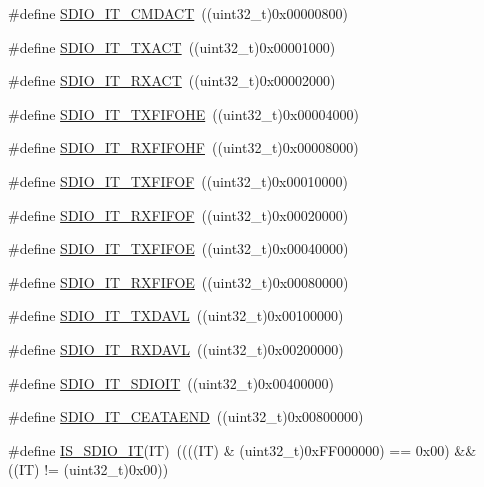 \begin{DoxyCompactItemize}
\item 
\#define \hyperlink{group___s_d_i_o___interrupt__sources_gae73ae9bc72eaeedc2a37221697bc33e2}{S\+D\+I\+O\+\_\+\+I\+T\+\_\+\+C\+M\+D\+A\+CT}~((uint32\+\_\+t)0x00000800)
\item 
\#define \hyperlink{group___s_d_i_o___interrupt__sources_ga811e683588ab887abb0101defafdb51e}{S\+D\+I\+O\+\_\+\+I\+T\+\_\+\+T\+X\+A\+CT}~((uint32\+\_\+t)0x00001000)
\item 
\#define \hyperlink{group___s_d_i_o___interrupt__sources_ga1d9a59a2415b57bdf9827423cb6ce3a0}{S\+D\+I\+O\+\_\+\+I\+T\+\_\+\+R\+X\+A\+CT}~((uint32\+\_\+t)0x00002000)
\item 
\#define \hyperlink{group___s_d_i_o___interrupt__sources_gaf538ae7dd73d55e76069e8710858038a}{S\+D\+I\+O\+\_\+\+I\+T\+\_\+\+T\+X\+F\+I\+F\+O\+HE}~((uint32\+\_\+t)0x00004000)
\item 
\#define \hyperlink{group___s_d_i_o___interrupt__sources_gadcbc1a0de8b9df83b5c6c839b4739c87}{S\+D\+I\+O\+\_\+\+I\+T\+\_\+\+R\+X\+F\+I\+F\+O\+HF}~((uint32\+\_\+t)0x00008000)
\item 
\#define \hyperlink{group___s_d_i_o___interrupt__sources_ga3ec471bd9233561d6e929ebac6362b75}{S\+D\+I\+O\+\_\+\+I\+T\+\_\+\+T\+X\+F\+I\+F\+OF}~((uint32\+\_\+t)0x00010000)
\item 
\#define \hyperlink{group___s_d_i_o___interrupt__sources_gae60a1d8e5a7caff85d84e513b093b8a8}{S\+D\+I\+O\+\_\+\+I\+T\+\_\+\+R\+X\+F\+I\+F\+OF}~((uint32\+\_\+t)0x00020000)
\item 
\#define \hyperlink{group___s_d_i_o___interrupt__sources_gabff1466c2f2effbe30b80a11c132d7c0}{S\+D\+I\+O\+\_\+\+I\+T\+\_\+\+T\+X\+F\+I\+F\+OE}~((uint32\+\_\+t)0x00040000)
\item 
\#define \hyperlink{group___s_d_i_o___interrupt__sources_ga80b01aaf64c873d21bfa95e5d98d8766}{S\+D\+I\+O\+\_\+\+I\+T\+\_\+\+R\+X\+F\+I\+F\+OE}~((uint32\+\_\+t)0x00080000)
\item 
\#define \hyperlink{group___s_d_i_o___interrupt__sources_gac8e5744e6d977182a6fc7484a6f1195e}{S\+D\+I\+O\+\_\+\+I\+T\+\_\+\+T\+X\+D\+A\+VL}~((uint32\+\_\+t)0x00100000)
\item 
\#define \hyperlink{group___s_d_i_o___interrupt__sources_gaf236079642db95772334d1e9b9b27570}{S\+D\+I\+O\+\_\+\+I\+T\+\_\+\+R\+X\+D\+A\+VL}~((uint32\+\_\+t)0x00200000)
\item 
\#define \hyperlink{group___s_d_i_o___interrupt__sources_gaf5d7559460a9ff1fccc82d815de25cb4}{S\+D\+I\+O\+\_\+\+I\+T\+\_\+\+S\+D\+I\+O\+IT}~((uint32\+\_\+t)0x00400000)
\item 
\#define \hyperlink{group___s_d_i_o___interrupt__sources_gae045cd5ba681d2df8b1031b8f659139a}{S\+D\+I\+O\+\_\+\+I\+T\+\_\+\+C\+E\+A\+T\+A\+E\+ND}~((uint32\+\_\+t)0x00800000)
\item 
\#define \hyperlink{group___s_d_i_o___interrupt__sources_ga0e413e92ec50bab73042e8965acc3e6c}{I\+S\+\_\+\+S\+D\+I\+O\+\_\+\+IT}(IT)~((((IT) \& (uint32\+\_\+t)0x\+F\+F000000) == 0x00) \&\& ((\+I\+T) != (uint32\+\_\+t)0x00))
\end{DoxyCompactItemize}


